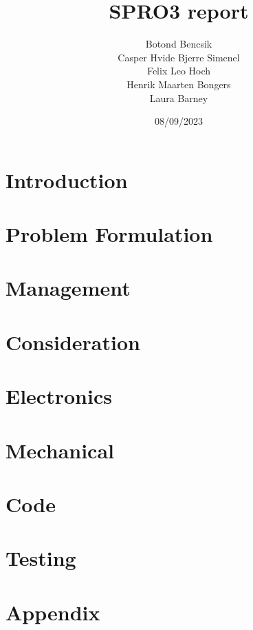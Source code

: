 \documentclass[11pt]{article}
\title{SPRO3 report}
\date{08/09/2023}
\author{Botond Bencsik\\Casper Hvide Bjerre Simenel\\Felix Leo Hoch\\Henrik Maarten Bongers\\Laura Barney}
\begin{document}
\maketitle

\newpage
\tableofcontents
\newpage
\section{Introduction}
         
\section{Problem Formulation}

\section{Management}

\section{Consideration}

\section{Electronics}

\section{Mechanical}

\section{Code}

\section{Testing}

\newpage
\section{Appendix}

%


\newpage
\end{document}
